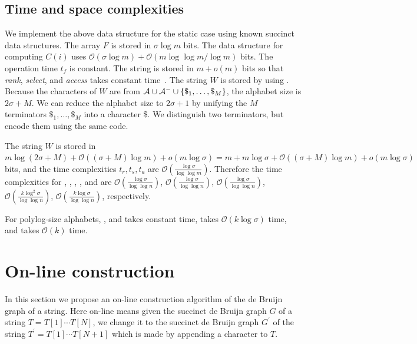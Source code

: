 \documentclass{llncs}
\newcommand{\Order}{\mathcal{O}}
\newcommand{\order}{o}
\def\rank{\textit{rank}}
\def\select{\textit{select}}
\def\access{\textit{access}}
\begin{document}
\subsection{Time and space complexities}
We implement the above data structure for the static case using known succinct data structures.
The array $F$ is stored in $\sigma \log m$ bits.  The data structure for computing $C(i)$
uses $\Order(\sigma \log m) + \Order(m \log \log m/\log m)$ bits.  The operation time $t_f$ is constant.
The string {\last} is stored in $m+\order(m)$ bits so that {\rank}, {\select}, and {\access} takes constant 
time~\cite{RRR07}.  The string $W$ is stored by using \cite{FerManMakNav06}.  
Because the characters
of $W$ are from ${\cal A} \cup {\cal A}^- \cup \{\$_1,\ldots,\$_M\}$, 
the alphabet size is $2\sigma + M$.
%
We can reduce the alphabet size to $2\sigma+1$ by unifying the $M$ terminators
$\$_1,\ldots,\$_M$ into a character \$.  We distinguish two terminators, but
encode them using the same code.

The string $W$ is stored in $m \log (2\sigma+M) +
\Order((\sigma+M) \log m) + \order(m \log\sigma)
 = m + m \log\sigma + \Order((\sigma+M) \log m) + \order(m \log\sigma)$ bits,
and the time complexities $t_r, t_s, t_a$ are 
$\Order(\frac{\log\sigma}{\log\log m})$.
Therefore the time complexities for {\cdeg}, {\pdeg}, {\child}, {\parent},
and {\search} are $\Order(\frac{\log\sigma}{\log\log n})$, 
$\Order(\frac{\log\sigma}{\log\log n})$, 
$\Order(\frac{\log\sigma}{\log\log n})$, 
$\Order(\frac{k\log^2\sigma}{\log\log n})$,
$\Order(\frac{k\log\sigma}{\log\log n})$, respectively.

For polylog-size alphabets, {\cdeg}, {\pdeg} and {\child} takes constant time,
{\parent} takes $\Order(k \log \sigma)$ time,
and {\search} takes $\Order(k)$ time.



\section{On-line construction}
In this section we propose an on-line construction algorithm of the de Bruijn graph of a string.
Here on-line means given the succinct de Bruijn graph $G$ of a string $T = T[1] \cdots T[N]$, we change it
to the succinct de Bruijn graph $G^\prime$ of the string $T^\prime = T[1] \cdots T[N+1]$ which is made by
appending a character to $T$.
%
\end{document}
